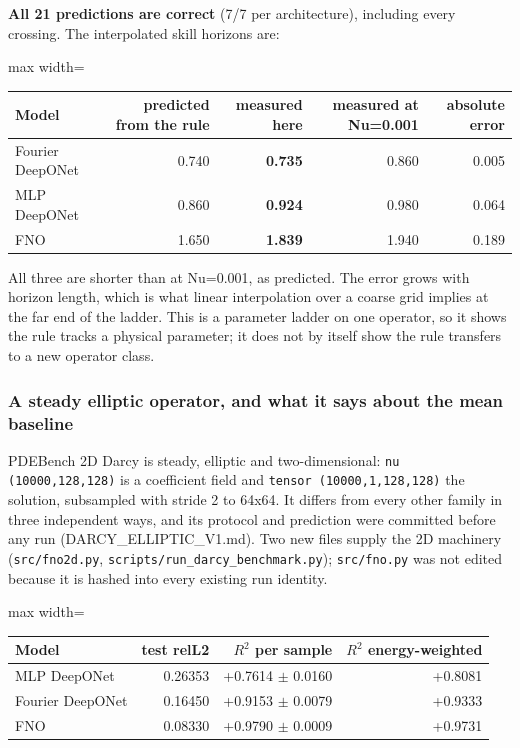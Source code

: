 \documentclass[preprint,12pt]{elsarticle}
\begin{document}
\textbf{All 21 predictions are correct} (7/7 per architecture), including every crossing. The interpolated skill horizons are:

\begin{center}
\begin{adjustbox}{max width=\linewidth}
\small
\begin{tabular}{lrrrr}
\toprule
Model & predicted from the rule & measured here & measured at Nu=0.001 & absolute error \\
\midrule
Fourier DeepONet & 0.740 & \textbf{0.735} & 0.860 & 0.005 \\
MLP DeepONet & 0.860 & \textbf{0.924} & 0.980 & 0.064 \\
FNO & 1.650 & \textbf{1.839} & 1.940 & 0.189 \\
\bottomrule
\end{tabular}
\end{adjustbox}
\end{center}


All three are shorter than at Nu=0.001, as predicted. The error grows with horizon length, which is what linear interpolation over a coarse grid implies at the far end of the ladder. This is a parameter ladder on one operator, so it shows the rule tracks a physical parameter; it does not by itself show the rule transfers to a new operator class.

\subsubsection{A steady elliptic operator, and what it says about the mean baseline}

PDEBench 2D Darcy is steady, elliptic and two-dimensional: \texttt{nu (10000,128,128)} is a coefficient field and \texttt{tensor (10000,1,128,128)} the solution, subsampled with stride 2 to 64x64. It differs from every other family in three independent ways, and its protocol and prediction were committed before any run (DARCY\_ELLIPTIC\_V1.md). Two new files supply the 2D machinery (\texttt{src/fno2d.py}, \texttt{scripts/run\_darcy\_benchmark.py}); \texttt{src/fno.py} was not edited because it is hashed into every existing run identity.

\begin{center}
\begin{adjustbox}{max width=\linewidth}
\small
\begin{tabular}{lrrr}
\toprule
Model & test relL2 & \textbf{$R^2$ per sample} & $R^2$ energy-weighted \\
\midrule
MLP DeepONet & 0.26353 & +0.7614 $\pm$ 0.0160 & +0.8081 \\
Fourier DeepONet & 0.16450 & +0.9153 $\pm$ 0.0079 & +0.9333 \\
FNO & 0.08330 & +0.9790 $\pm$ 0.0009 & +0.9731 \\
\bottomrule
\end{tabular}
\end{adjustbox}
\end{center}
\end{document}
